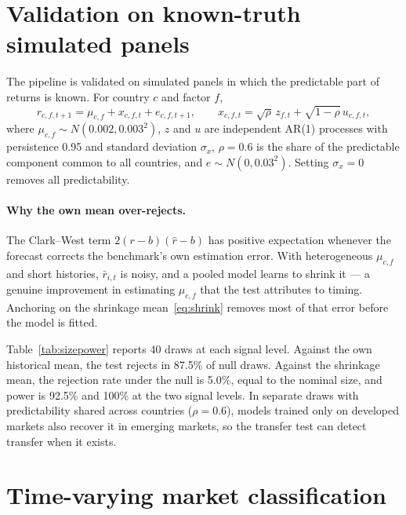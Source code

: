 \documentclass[11pt]{article}
\begin{document}
\clearpage


\clearpage
\appendix
\section{Validation on known-truth simulated panels}
\label{app:validation}

The pipeline is validated on simulated panels in which the predictable part of returns is known. For country $c$ and factor $f$,
\begin{equation}
r_{c,f,t+1} = \mu_{c,f} + x_{c,f,t} + e_{c,f,t+1}, \qquad
x_{c,f,t} = \sqrt{\rho}\, z_{f,t} + \sqrt{1-\rho}\, u_{c,f,t},
\label{eq:dgp}
\end{equation}
where $\mu_{c,f} \sim N(0.002, 0.003^2)$, $z$ and $u$ are independent AR(1) processes with persistence 0.95 and standard deviation $\sigma_x$, $\rho = 0.6$ is the share of the predictable component common to all countries, and $e \sim N(0, 0.03^2)$. Setting $\sigma_x = 0$ removes all predictability.

\paragraph{Why the own mean over-rejects.} The Clark--West term $2(r-b)(\hat r - b)$ has positive expectation whenever the forecast corrects the benchmark's own estimation error. With heterogeneous $\mu_{c,f}$ and short histories, $\bar r_{i,t}$ is noisy, and a pooled model learns to shrink it --- a genuine improvement in estimating $\mu_{c,f}$ that the test attributes to timing. Anchoring on the shrinkage mean~\eqref{eq:shrink} removes most of that error before the model is fitted.



Table~\ref{tab:sizepower} reports 40 draws at each signal level. Against the own historical mean, the test rejects in 87.5\% of null draws. Against the shrinkage mean, the rejection rate under the null is 5.0\%, equal to the nominal size, and power is 92.5\% and 100\% at the two signal levels. In separate draws with predictability shared across countries ($\rho = 0.6$), models trained only on developed markets also recover it in emerging markets, so the transfer test can detect transfer when it exists.

\clearpage
\section{Time-varying market classification}
\label{app:classification}
\end{document}
